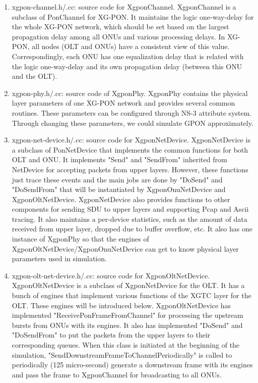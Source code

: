 \begin{enumerate}
 \item xgpon-channel.h/.cc: source code for {\color{red} XgponChannel}. XgponChannel is a subclass of PonChannel for XG-PON. 
It maintains the logic one-way-delay for the whole XG-PON network, which should be set based on the largest propagation 
delay among all ONUs and various processing delays. In XG-PON, all nodes (OLT and ONUs) have a consistent view of this value. 
Correspondingly, each ONU has one equalization delay that is related with the logic one-way-delay and its 
own propagation delay (between this ONU and the OLT).

 \item xgpon-phy.h/.cc: source code of {\color{red} XgponPhy}. XgponPhy contains the physical layer parameters of 
one XG-PON network and provides several common routines. These parameters can be configured through NS-3 attribute system. 
Through changing these parameters, we could simulate GPON approximately.

 \item xgpon-net-device.h/.cc: source code for {\color{red} XgponNetDevice}. XgponNetDevice is a subclass of PonNetDevice 
that implements the common functions for both OLT and ONU. It implements "Send" and "SendFrom" inherited from NetDevice 
for accepting packets from upper layers. However, these functions just trace these events and the main jobs are done 
by "DoSend" and "DoSendFrom" that will be instantiated by XgponOnuNetDevice and XgponOltNetDevice. XgponNetDevice also 
provides functions to other components for sending SDU to upper layers and supporting Pcap and Ascii tracing. 
It also maintains a per-device statistics, such as the amount of data received from upper layer, dropped due to 
buffer overflow, etc. It also has one instance of XgponPhy so that the engines of XgponOltNetDevice/XgponOnuNetDevice 
can get to know physical layer parameters used in simulation.

 \item xgpon-olt-net-device.h/.cc: source code for {\color{red} XgponOltNetDevice}. XgponOltNetDevice is a subclass 
of XgponNetDevice for the OLT. It has a bunch of engines that implement various functions of the XGTC layer for the OLT. 
These engines will be introduced below. XgponOltNetDevice has implemented "ReceivePonFrameFromChannel" for processing 
the upstream bursts from ONUs with its engines. It also has implemented "DoSend" and "DoSendFrom" to put the packets 
from the upper layers to their corresponding queues. When this class is initiated at the beginning of the simulation, 
"SendDownstreamFrameToChannelPeriodically" is called to periodically (125 micro-second) generate a downstream frame with 
its engines and pass the frame to XgponChannel for broadcasting to all ONUs.


\end{enumerate}
